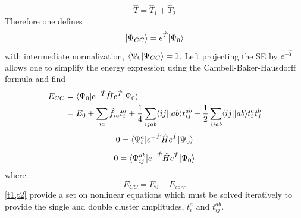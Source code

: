         \begin{equation}
          \hat{T} = \hat{T}_1 + \hat{T}_2
        \end{equation}
      Therefore one defines
        \begin{equation}\label{CC_wfn}
          | \Psi_{CC} \rangle = e^{\hat{T}}| \Psi_0 \rangle
        \end{equation}
      with intermediate normalization, $\langle\Psi_0|\Psi_{CC}\rangle = 1$. 
      Left projecting the SE by $e^{-\hat{T}}$ allows one to simplify the energy expression using the Cambell-Baker-Hausdorff formula\cite{Crawford 2000} and find%
        \begin{equation}
          \begin{aligned}
            E_{CC} &= \langle\Psi_0 |e^{-\hat{T}} \hat{H} e^{\hat{T}} | \Psi_0 \rangle \\
            &= E_0 + \sum_{ia} \hat{f}_{ia}t^a_i + \frac{1}{4} \sum_{ijab} \langle ij || ab \rangle t^{ab}_{ij} + \frac{1}{2} \sum_{ijab} \langle ij || ab \rangle t^a_i t^b_j
          \end{aligned}
        \end{equation}
        \begin{equation}\label{t1}
          0 = \langle\Psi^a_i | e^{-\hat{T}} \hat{H} e^{\hat{T}} | \Psi_0 \rangle
        \end{equation}
        \begin{equation}\label{t2}
          0 = \langle\Psi^{ab}_{ij} | e^{-\hat{T}} \hat{H} e^{\hat{T}} | \Psi_0 \rangle
        \end{equation}
      where 
        \begin{equation}
          E_{CC} = E_0 + E_{corr}
        \end{equation}
      \cref{t1,t2} provide a set on nonlinear equations which must be solved iteratively to provide the single and double cluster amplitudes, $t^a_i$ and $t^{ab}_{ij}$.
